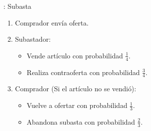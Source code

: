 %
%
%

\begin{frame}{\insertsection: Subasta}
	\begin{enumerate}
		\item Comprador envía oferta.
		\item Subastador:
			\begin{itemize}
				\item Vende artículo con probabilidad $\frac{1}{4}$.
				\item Realiza contraoferta con probabilidad $\frac{3}{4}$.
			\end{itemize}
		\item Comprador (Si el artículo no se vendió):
			\begin{itemize}
				\item Vuelve a ofertar con probabilidad $\frac{1}{3}$.
				\item Abandona subasta con probabilidad $\frac{2}{3}$.
			\end{itemize}
	\end{enumerate}
\end{frame}

